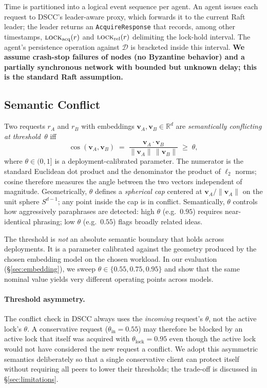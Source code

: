 \documentclass[sigconf]{acmart}
\begin{document}
Time is partitioned into a logical event sequence per agent. An agent issues
each request to DSCC's leader-aware proxy, which forwards it to the current
Raft leader; the leader returns an \texttt{AcquireResponse} that records,
among other timestamps, $\textsc{lock}_\textrm{acq}(r)$ and
$\textsc{lock}_\textrm{rel}(r)$ delimiting the lock-hold interval. The
agent's persistence operation against $\mathcal{D}$ is bracketed inside this
interval. \textbf{We assume crash-stop failures of nodes (no Byzantine behavior)
and a partially synchronous network with bounded but unknown delay; this is
the standard Raft assumption.}

\subsection{Semantic Conflict}
\label{sec:semantic-conflict}

Two requests $r_A$ and $r_B$ with embeddings $\mathbf{v}_A,\mathbf{v}_B\in
\mathbb{R}^d$ are \emph{semantically conflicting at threshold~$\theta$} iff
\begin{equation}
  \cos(\mathbf{v}_A,\mathbf{v}_B)
  \;=\;\frac{\mathbf{v}_A\cdot\mathbf{v}_B}{\|\mathbf{v}_A\|\,\|\mathbf{v}_B\|}
  \;\ge\;\theta,
  \label{eq:conflict}
\end{equation}
where $\theta\in(0,1]$ is a deployment-calibrated parameter. The numerator
is the standard Euclidean dot product and the denominator the product of
$\ell_2$ norms; cosine therefore measures the angle between the two vectors
independent of magnitude. Geometrically, $\theta$ defines a
\emph{spherical cap} centered at $\mathbf{v}_A/\|\mathbf{v}_A\|$ on the
unit sphere $S^{d-1}$; any point inside the cap is in conflict.
Semantically, $\theta$ controls how aggressively paraphrases are detected:
high $\theta$ (e.g.\ $0.95$) requires near-identical phrasing; low $\theta$
(e.g.\ $0.55$) flags broadly related ideas.

The threshold is \emph{not} an absolute semantic boundary that holds across
deployments. It is a parameter calibrated against the geometry produced by
the chosen embedding model on the chosen workload. In our evaluation
(\S\ref{sec:embedding}), we sweep $\theta\in\{0.55,0.75,0.95\}$ and show
that the same nominal value yields very different operating points across
models.

\paragraph{\textbf{Threshold asymmetry.}}
The conflict check in DSCC always uses the \emph{incoming} request's
$\theta$, not the active lock's $\theta$. A conservative request
($\theta_\textrm{in}=0.55$) may therefore be blocked by an active lock that
itself was acquired with $\theta_\textrm{lock}=0.95$ even though the active
lock would not have considered the new request a conflict. We adopt this
asymmetric semantics deliberately so that a single conservative client can
protect itself without requiring all peers to lower their thresholds; the
trade-off is discussed in \S\ref{sec:limitations}.
\end{document}
